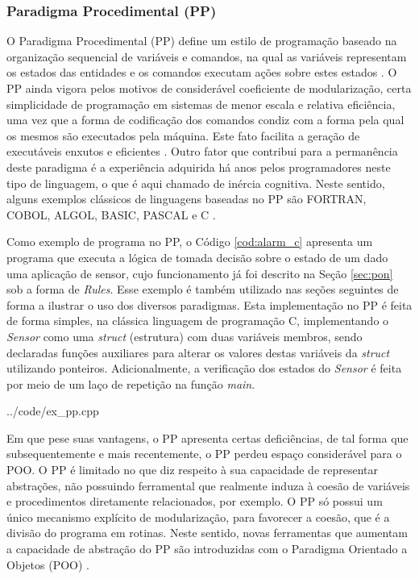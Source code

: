 \subsubsection{Paradigma Procedimental (PP)}

O Paradigma Procedimental (PP) define um estilo de programação baseado na
organização sequencial de variáveis e comandos, na qual as variáveis representam
os estados das entidades e os comandos executam ações sobre estes estados
\cite{watt_2004,brookshear_2006}. O PP ainda vigora pelos motivos de
considerável coeficiente de modularização, certa simplicidade de programação em
sistemas de menor escala e relativa eficiência, uma vez que a forma de
codificação dos comandos condiz com a forma pela qual os mesmos são executados
pela máquina. Este fato facilita a geração de executáveis enxutos e eficientes
\cite{msc_Banaszewski_2009}. Outro fator que contribui para a permanência deste
paradigma é a experiência adquirida há anos pelos programadores neste tipo de
linguagem, o que é aqui chamado de inércia cognitiva. Neste sentido, alguns
exemplos clássicos de linguagens baseadas no PP são FORTRAN, COBOL, ALGOL,
BASIC, PASCAL e C \cite{msc_Banaszewski_2009}.

Como exemplo de programa no PP, o Código \ref{cod:alarm_c} apresenta um programa
que executa a lógica de tomada decisão sobre o estado de um dado uma aplicação
de sensor, cujo funcionamento já foi descrito na Seção \ref{sec:pon} sob a forma
de \textit{Rules}. Esse exemplo é também utilizado nas seções seguintes de forma a
ilustrar o uso dos diversos paradigmas. Esta implementação no PP é feita de
forma simples, na clássica linguagem de programação C, implementando o
\textit{Sensor} como uma \textit{struct} (estrutura) com duas variáveis membros, sendo
declaradas funções auxiliares para alterar os valores destas variáveis da
\textit{struct} utilizando ponteiros. Adicionalmente, a verificação dos estados
do \textit{Sensor} é feita por meio de um laço de repetição na função
\textit{main}.


{../code/ex_pp.cpp}

Em que pese suas vantagens, o PP apresenta certas deficiências, de tal forma que
subsequentemente e mais recentemente, o PP perdeu espaço considerável para o
POO. O PP é limitado no que diz respeito à sua capacidade de representar
abstrações, não possuindo ferramental que realmente induza à coesão de variáveis e
procedimentos diretamente relacionados, por exemplo. O PP só possui um único
mecanismo explícito de modularização, para favorecer a coesão, que é a divisão
do programa em rotinas. Neste sentido, novas ferramentas que aumentam a
capacidade de abstração do PP são introduzidas com o Paradigma Orientado a
Objetos (POO) \cite{Avacheva_2020}.

